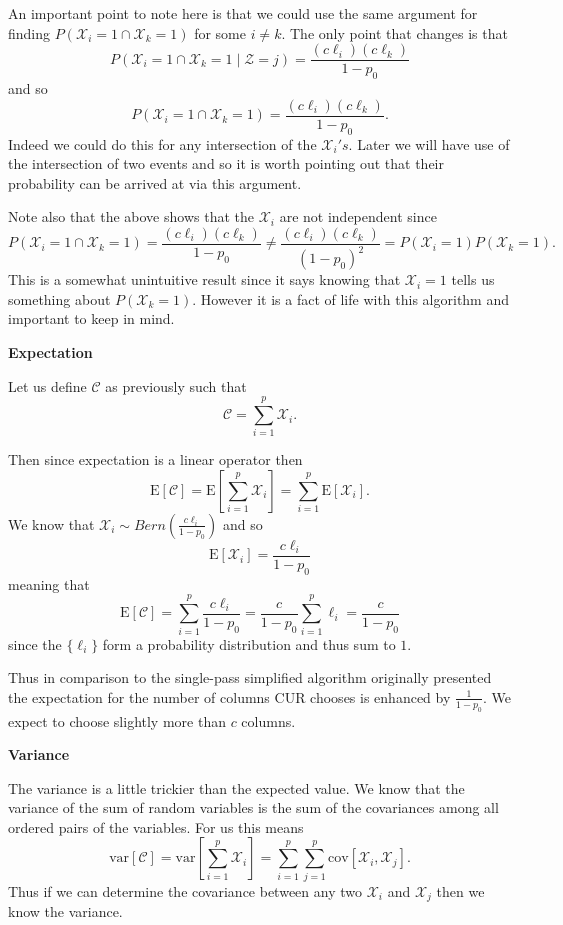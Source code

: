 \documentclass{book}
\begin{document}
An important point to note here is that we could use the same argument for finding $P(\mathscr{X}_i=1 \cap \mathscr{X}_k=1)$ for some $i\neq k$. The only point that changes is that 
$$
P(\mathscr{X}_i=1 \cap \mathscr{X}_k=1\mid \mathscr{Z}=j)=\frac{(c\ell_i)(c\ell_k)}{1-p_0}
$$
and so 
$$
P(\mathscr{X}_i=1 \cap \mathscr{X}_k=1)=\frac{(c\ell_i)(c\ell_k)}{1-p_0}.
$$
Indeed we could do this for any intersection of the $\mathscr{X}_i's$. Later we will have use of the intersection of two events and so it is worth pointing out that their probability can be arrived at via this argument.

Note also that the above shows that the $\mathscr{X}_i$ are not independent since 
$$
P(\mathscr{X}_i=1 \cap \mathscr{X}_k=1)=\frac{(c\ell_i)(c\ell_k)}{1-p_0}\neq \frac{(c\ell_i)(c\ell_k)}{(1-p_0)^2}=P(\mathscr{X}_i=1)P(\mathscr{X}_k=1).
$$
This is a somewhat unintuitive result since it says knowing that $\mathscr{X}_i=1$ tells us something about $P(\mathscr{X}_k=1)$. However it is a fact of life with this algorithm and important to keep in mind. 

\vspace{.5cm}
{\bf Expectation}
\vspace{.5cm}

Let us define $\mathscr{C}$ as previously such that
$$
\mathscr{C}=\sum_{i=1}^{p}\mathscr{X}_i.
$$

Then since expectation is a linear operator then
$$
\text{E}[\mathscr{C}]=\text{E}\left[\sum_{i=1}^{p}\mathscr{X}_i\right]=\sum_{i=1}^{p}\text{E}[\mathscr{X}_i].
$$
We know that $\mathscr{X}_i \sim Bern\left(\frac{c\ell_i}{1-p_0}\right)$ and so 
$$
\text{E}[\mathscr{X}_i]=\frac{c\ell_i}{1-p_0}
$$
meaning that
$$
\text{E}[\mathscr{C}]=\sum_{i=1}^{p}\frac{c\ell_i}{1-p_0}=\frac{c}{1-p_0}\sum_{i=1}^{p}\ell_i=\frac{c}{1-p_0}
$$
since the $\{\ell_i\}$ form a probability distribution and thus sum to $1$. 

Thus in comparison to the single-pass simplified algorithm originally presented the expectation for the number of columns CUR chooses is enhanced by $\frac{1}{1-p_0}$. We expect to choose slightly more than $c$ columns. 

\vspace{.5cm}
{\bf Variance}
\vspace{.5cm}

The variance is a little trickier than the expected value. We know that the variance of the sum of random variables is the sum of the covariances among all ordered pairs of the variables. For us this means
$$
\text{var}\left[\mathscr{C}\right]=\text{var}\left[\sum_{i=1}^{p}\mathscr{X}_i\right]=\sum_{i=1}^{p}\sum_{j=1}^{p}\text{cov}\left[\mathscr{X}_i,\mathscr{X}_j\right].
$$
Thus if we can determine the covariance between any two $\mathscr{X}_i$ and $\mathscr{X}_j$ then we know the variance.
\end{document}
